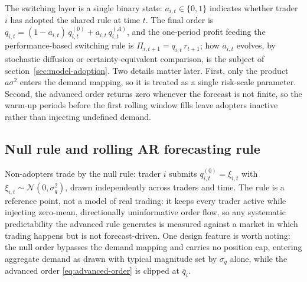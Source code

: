 \documentclass[12pt]{article}
\begin{document}
The switching layer is a single binary state: $a_{i,t} \in \{0, 1\}$ indicates whether trader $i$ has adopted the shared rule at time $t$. The final order is $q_{i,t} = (1 - a_{i,t})\, q_{i,t}^{(0)} + a_{i,t}\, q_{i,t}^{(A)}$, and the one-period profit feeding the performance-based switching rule is $\Pi_{i,t+1} = q_{i,t}\, r_{t+1}$; how $a_{i,t}$ evolves, by stochastic diffusion or certainty-equivalent comparison, is the subject of section~\ref{sec:model-adoption}. Two details matter later. First, only the product $a\sigma^{2}$ enters the demand mapping, so it is treated as a single risk-scale parameter. Second, the advanced order returns zero whenever the forecast is not finite, so the warm-up periods before the first rolling window fills leave adopters inactive rather than injecting undefined demand. %

\subsection{Null rule and rolling AR forecasting rule}\label{sec:model-rules}

Non-adopters trade by the null rule: trader $i$ submits $q_{i,t}^{(0)} = \xi_{i,t}$ with $\xi_{i,t} \sim \mathcal{N}(0, \sigma_{q}^{2})$, drawn independently across traders and time. The rule is a reference point, not a model of real trading: it keeps every trader active while injecting zero-mean, directionally uninformative order flow, so any systematic predictability the advanced rule generates is measured against a market in which trading happens but is not forecast-driven. One design feature is worth noting: the null order bypasses the demand mapping and carries no position cap, entering aggregate demand as drawn with typical magnitude set by $\sigma_q$ alone, while the advanced order \eqref{eq:advanced-order} is clipped at $\bar{q}_{i}$. %
\end{document}
